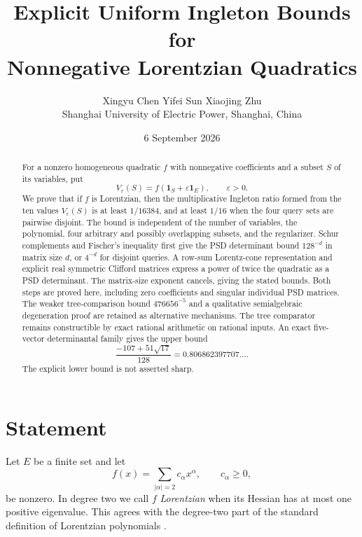 \documentclass[11pt]{article}
\title{Explicit Uniform Ingleton Bounds for\\Nonnegative Lorentzian Quadratics}
\author{Xingyu Chen \qquad Yifei Sun \qquad Xiaojing Zhu\\
\small Shanghai University of Electric Power, Shanghai, China}
\date{6 September 2026}
\theoremstyle{remark}
\newcommand{\one}{\mathbf{1}}
\begin{document}
\maketitle

\begin{abstract}
For a nonzero homogeneous quadratic $f$ with nonnegative coefficients and a
subset $S$ of its variables, put
\[
 V_\varepsilon(S)=f(\one_S+\varepsilon\one_E),\qquad \varepsilon>0.
\]
We prove that if $f$ is Lorentzian, then the multiplicative Ingleton ratio
formed from the ten values $V_\varepsilon(S)$ is at least $1/16384$,
and at least $1/16$ when the four query sets are pairwise disjoint.
The bound is independent of the number of variables, the polynomial, four
arbitrary and possibly overlapping subsets, and the regularizer.
Schur complements and Fischer's inequality first give the PSD determinant
bound $128^{-d}$ in matrix size $d$, or $4^{-d}$ for disjoint queries.
A row-sum Lorentz-cone representation and explicit real symmetric
Clifford matrices express a power of twice the quadratic as a PSD
determinant.  The matrix-size exponent cancels, giving the stated bounds.
Both steps are proved here, including zero coefficients and singular
individual PSD matrices.  The weaker tree-comparison bound $476656^{-5}$
and a qualitative semialgebraic degeneration proof are retained as
alternative mechanisms.  The tree comparator remains constructible by
exact rational arithmetic on rational inputs.  An exact
five-vector determinantal family gives the upper bound
\[
 \frac{-107+51\sqrt{17}}{128}=0.806862397707\ldots.
\]
The explicit lower bound is not asserted sharp.
\end{abstract}

\section{Statement}

Let $E$ be a finite set and let
\[
 f(x)=\sum_{|\alpha|=2}c_\alpha x^\alpha,
 \qquad c_\alpha\geq 0,
\]
be nonzero.  In degree two we call $f$ \emph{Lorentzian} when its Hessian has
at most one positive eigenvalue.  This agrees with the degree-two part of the
standard definition of Lorentzian polynomials
\cite{BrandenHuh2020}.
\end{document}
